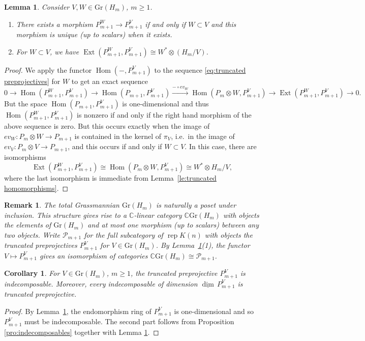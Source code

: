 \documentclass{amsart}
\newtheorem{corollary}[theorem]{Corollary}
\newtheorem{lemma}[theorem]{Lemma}
\newtheorem{remark}[theorem]{Remark}
\numberwithin{equation}{section}
\newcommand{\cP}{\mathcal{P}}
\newcommand\udim{{\underline{\dim}\, }}
\newcommand{\rep}{\operatorname{rep}}
\newcommand{\Gr}{\mathrm{Gr}}
\newcommand{\CC}{\mathbb{C}}
\newcommand{\Ext}{\operatorname{Ext}}
\newcommand{\Hom}{\operatorname{Hom}}
\begin{document}
\begin{lemma}
  \label{le:unique morphisms}
  Consider $V,W\in \Gr(H_m)$, $m\ge1$.
  \begin{enumerate}
    \item There exists a morphism $P_{m+1}^W\to P_{m+1}^V$ if and only if $W\subset V$ and this morphism is unique (up to scalars) when it exists.
    \item For $W\subset V$, we have $\Ext(P_{m+1}^W,P_{m+1}^V)\cong W^*\otimes(H_m/V)$.
  \end{enumerate}
\end{lemma}
\begin{proof}
  We apply the functor $\Hom(-,P_{m+1}^V)$ to the sequence \eqref{eq:truncated preprojectives} for $W$ to get an exact sequence
  \[0\longrightarrow \Hom(P_{m+1}^W,P_{m+1}^V)\longrightarrow \Hom(P_{m+1},P_{m+1}^V)\stackrel{-\circ ev_W}{\longrightarrow} \Hom(P_m\otimes W,P_{m+1}^V)\longrightarrow \Ext(P_{m+1}^W,P_{m+1}^V)\longrightarrow 0.\]
  But the space $\Hom(P_{m+1},P_{m+1}^V)$ is one-dimensional and thus $\Hom(P_{m+1}^W,P_{m+1}^V)$ is nonzero if and only if the right hand morphism of the above sequence is zero.
  But this occurs exactly when the image of $ev_W:P_m\otimes W\to P_{m+1}$ is contained in the kernel of $\pi_V$, i.e.\ in the image of $ev_V:P_m\otimes V\to P_{m+1}$, and this occurs if and only if $W\subset V$. 
  In this case, there are isomorphisms
  \[\Ext(P_{m+1}^W,P_{m+1}^V)\cong\Hom(P_m\otimes W,P_{m+1}^V)\cong W^*\otimes H_m/V,\]
  where the last isomorphism is immediate from Lemma~\ref{le:truncated homomorphisms}.
\end{proof}

\begin{remark}
  The total Grassmannian $\Gr(H_m)$ is naturally a poset under inclusion.
  This structure gives rise to a $\CC$-linear category $\CC \Gr(H_m)$ with objects the elements of $\Gr(H_m)$ and at most one morphism (up to scalars) between any two objects.
  Write $\cP_{m+1}$ for the full subcategory of $\rep K(n)$ with objects the truncated preprojectives $P_{m+1}^V$ for $V\in \Gr(H_m)$.
  By Lemma~\ref{le:unique morphisms}(1), the functor $V\mapsto P_{m+1}^V$ gives an isomorphism of categories $\CC \Gr(H_m)\cong\cP_{m+1}$.
\end{remark}

\begin{corollary}
  \label{cor:indecomposable truncated} 
  For $V\in \Gr(H_m)$, $m\ge1$, the truncated preprojective $P_{m+1}^V$ is indecomposable.
  Moreover, every indecomposable of dimension $\udim P_{m+1}^V$ is truncated preprojective.
\end{corollary}
\begin{proof}
  By Lemma~\ref{le:unique morphisms}, the endomorphism ring of $P_{m+1}^V$ is one-dimensional and so $P_{m+1}^V$ must be indecomposable.
  The second part follows from Proposition \ref{pro:indecomposables} together with Lemma \ref{le:unique morphisms}.
\end{proof}
\end{document}
